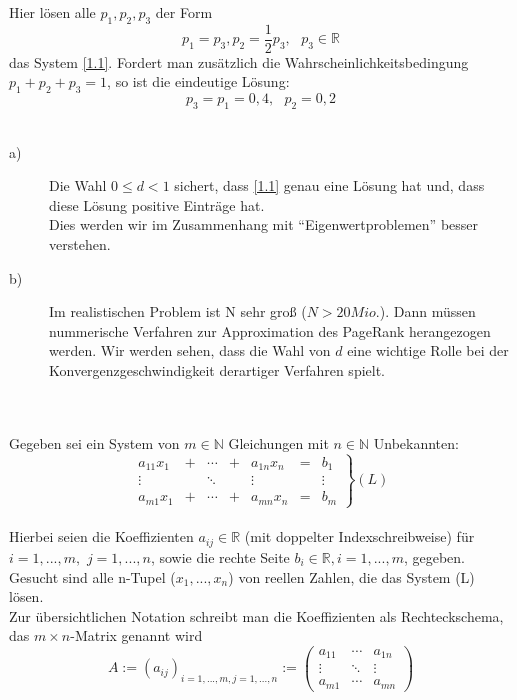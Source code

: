 \documentclass{scrbook}
\begin{document}
Hier lösen alle \(p_1, p_2, p_3\) der Form
\[p_1=p_3, p_2 = \dfrac{1}{2}p_3,\text{ }p_3\in\mathbb{R}\]
das System \ref{1.1}. Fordert man zusätzlich die Wahrscheinlichkeitsbedingung \(p_1+p_2+p_3=1\), so ist die eindeutige Lösung:
\[p_3=p_1 = 0,4,\text{ } p_2=0,2\]
\\
\textbf{}
\begin{description}
\item[a)] Die Wahl \(0\leq d<1\) sichert, dass \ref{1.1} genau eine Lösung hat und, dass diese Lösung positive Einträge hat.\\
Dies werden wir im Zusammenhang mit "`Eigenwertproblemen"' besser verstehen.\\
\item[b)] Im realistischen Problem ist N sehr groß (\(N>20Mio.\)). Dann müssen nummerische Verfahren zur Approximation des PageRank herangezogen werden. Wir werden sehen, dass die Wahl von $d$ eine wichtige Rolle bei der Konvergenzgeschwindigkeit derartiger Verfahren spielt.\\
\end{description}
\textbf{}\\
\\
Gegeben sei ein System von \(m\in\mathbb{N}\) Gleichungen mit \(n\in\mathbb{N}\) Unbekannten:\\
\[
\left.
\begin{array}{ccccccc}
a_{11}x_1 & +  &\cdots & + & a_{1n}x_n & = & b_1\\
\vdots & & \ddots & & \vdots & & \vdots\\
a_{m1}x_1 & + & \cdots & + & a_{mn}x_n & = & b_m
\end{array}
\right\}
(L)
\]
\\
Hierbei seien die Koeffizienten \(a_{ij} \in \mathbb{R}\) (mit doppelter Indexschreibweise) für \(i=1,...,m,\) \(j=1,...,n\), sowie die rechte Seite \(b_i \in \mathbb{R}, i=1,...,m\), gegeben.\\
Gesucht sind alle n-Tupel (\(x_1,...,x_n\)) von reellen Zahlen, die das System (L) lösen.\\
Zur übersichtlichen Notation schreibt man die Koeffizienten als Rechteckschema, das \(m\times n\)-Matrix genannt wird\\
\[
A:=(a_{ij})_{i=1,...,m,j=1,...,n}:=
\left(
\begin{array}{ccc}
a_{11}&\cdots&a_{1n}\\
\vdots&\ddots&\vdots\\
a_{m1}&\cdots&a_{mn}
 \end{array}
 \right)
\]
\end{document}
